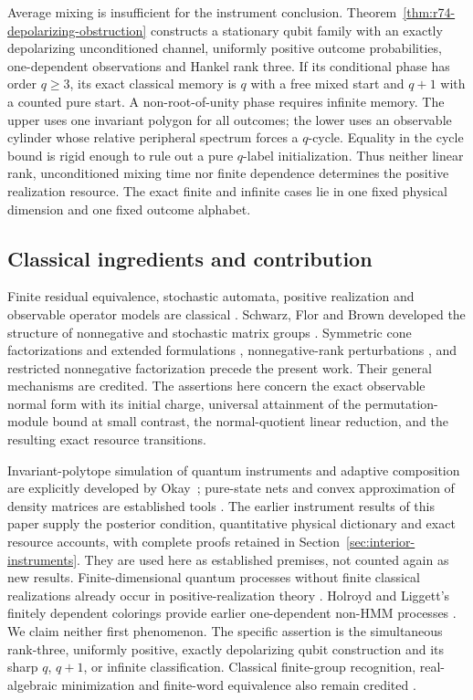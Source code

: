 Average mixing is insufficient for the instrument conclusion.
Theorem~\ref{thm:r74-depolarizing-obstruction} constructs a stationary
qubit family with an exactly depolarizing unconditioned channel, uniformly
positive outcome probabilities, one-dependent observations and Hankel rank
three. If its conditional phase has order $q\ge3$, its exact classical
memory is $q$ with a free mixed start and $q+1$ with a counted pure start.
A non-root-of-unity phase requires infinite memory. The upper uses one
invariant polygon for all outcomes; the lower uses an observable cylinder
whose relative peripheral spectrum forces a $q$-cycle. Equality in the
cycle bound is rigid enough to rule out a pure $q$-label initialization.
Thus neither linear rank, unconditioned mixing time nor finite dependence
determines the positive realization resource. The exact finite and infinite
cases lie in one fixed physical dimension and one fixed outcome alphabet.

\subsection*{Classical ingredients and contribution}
Finite residual equivalence, stochastic automata, positive realization and
observable operator models are classical
\cite{RabinScott59,Heller65,CarlylePaz71,Jaeger00,ThonJaeger15,MonrasWinter14}.
Schwarz, Flor and Brown developed the structure of nonnegative and
stochastic matrix groups \cite{Schwarz64,Flor69,Brown64,Schwarz62}.
Symmetric cone factorizations and extended formulations
\cite{GPT13,KPT10}, nonnegative-rank perturbations
\cite{BocciCarliniRapallo11}, and restricted nonnegative factorization
\cite{GillisGlineur12} precede the present work. Their general mechanisms
are credited. The assertions here concern the exact observable normal form
with its initial charge, universal attainment of the permutation-module
bound at small contrast, the normal-quotient linear reduction, and the
resulting exact resource transitions.

Invariant-polytope simulation of quantum instruments and adaptive
composition are explicitly developed by Okay~\cite{Okay26}; pure-state
nets and convex approximation of density matrices are established tools
\cite{AubrunSzarek17}. The earlier instrument results of this paper supply the posterior condition,
quantitative physical dictionary and exact resource accounts, with complete
proofs retained in Section~\ref{sec:interior-instruments}. They are used
here as established premises, not counted again as new results.
Finite-dimensional quantum processes without finite classical realizations
already occur in positive-realization theory \cite{Fanizza24}.
Holroyd and Liggett's finitely dependent colorings provide earlier
one-dependent non-HMM processes \cite{HolroydLiggett16}. We claim neither
first phenomenon. The specific assertion is the simultaneous rank-three,
uniformly positive, exactly depolarizing qubit construction and its sharp
$q$, $q+1$, or infinite classification. Classical finite-group recognition,
real-algebraic minimization and finite-word equivalence also remain credited
\cite{Serre07,BabaiBealsRockmore93,KieferWachter14,Tzeng92}.

